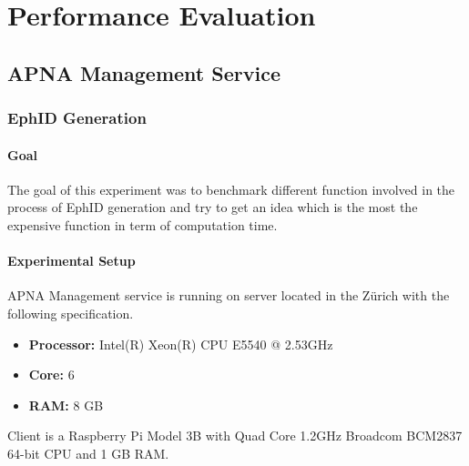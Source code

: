 
\chapter{Performance Evaluation} %
\label{performance} %

\section{APNA Management Service}
\subsection{EphID Generation}
\subsubsection{Goal}
The goal of this experiment was to benchmark different function involved in the process of EphID generation and try to get an idea which is the most the expensive function in term of computation time.
\subsubsection{Experimental Setup}
APNA Management service is running on server located in the Z\"urich with the following specification.
\begin{itemize}
    \item \textbf{Processor:} Intel(R) Xeon(R) CPU E5540  @ 2.53GHz
    \item \textbf{Core:} 6
    \item \textbf{RAM:} 8 GB
\end{itemize}
Client is a Raspberry Pi Model 3B with Quad Core 1.2GHz Broadcom BCM2837 64-bit CPU and 1 GB RAM.
